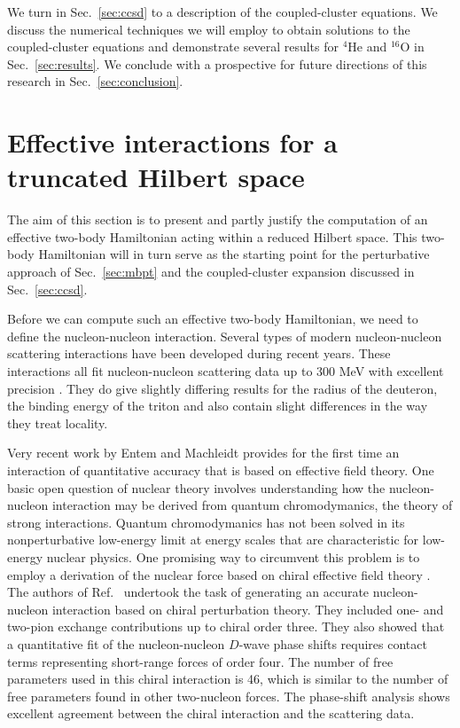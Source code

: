 \documentclass[aps,prc,twocolumn,floatfix]{revtex4}
\begin{document}
We turn in Sec.~\ref{sec:ccsd}  to a 
description of the coupled-cluster equations. 
We discuss the numerical techniques
we will employ to obtain solutions to the coupled-cluster
equations and demonstrate several results 
for $^{4}$He and $^{16}$O in Sec.~\ref{sec:results}.
We conclude with a prospective for future directions of this research
in Sec.~\ref{sec:conclusion}. 

\section{Effective interactions for a truncated Hilbert space}
\label{sec:gmatrix}
The aim of this section is to present and partly justify the computation of 
an effective two-body Hamiltonian acting within a reduced Hilbert space.
This two-body Hamiltonian will in turn serve as the starting point for the
perturbative approach of Sec.~\ref{sec:mbpt} and the 
coupled-cluster expansion discussed in Sec.~\ref{sec:ccsd}.

Before we can compute such an effective two-body Hamiltonian,
we need to define the nucleon-nucleon interaction.    
Several types of modern nucleon-nucleon scattering interactions
have been developed during recent years. These interactions all 
fit nucleon-nucleon scattering data up to 300 MeV with excellent
precision \cite{cdbonn,bob95,stoks94}. They do give slightly differing
results for the radius of the deuteron, the binding energy of the triton
and also contain slight differences in the way they treat locality. 

Very recent work by Entem and Machleidt \cite{machleidt02}
provides for the first time an interaction of quantitative accuracy
that is based on effective field theory. One basic open question of 
nuclear theory involves understanding how the nucleon-nucleon interaction
may be derived from quantum chromodymanics, 
the theory of strong interactions. Quantum chromodymanics has
not been solved in its nonperturbative low-energy limit at energy scales
that are characteristic for low-energy nuclear physics. One promising
way to circumvent this problem is to employ a derivation of the nuclear
force based on chiral effective field theory 
\cite{weinberg,vankolck}. The authors of Ref.~\cite{machleidt02} 
undertook the task of generating an accurate
nucleon-nucleon interaction  based on chiral perturbation theory. They
included one- and two-pion exchange contributions up to 
chiral order three. They also showed that a quantitative fit of the 
nucleon-nucleon $D$-wave phase shifts requires contact terms representing
short-range forces of order four. The number of free parameters used in
this chiral interaction is 46, which is similar to the number of free
parameters found in other two-nucleon forces. The phase-shift analysis
shows excellent agreement between the chiral interaction and the scattering
data. 
\end{document}
